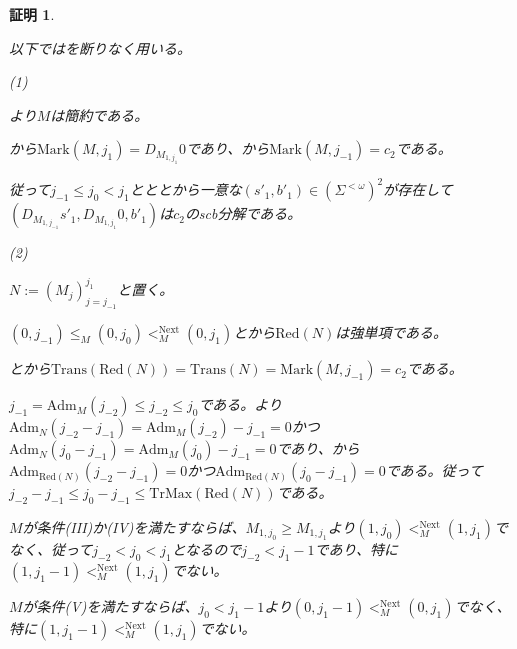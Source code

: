 \documentclass[dvipdfmx,uplatex]{jsarticle}
\theoremstyle{customnonumberbreakfortheorem}
\theoremstyle{customnonumberbreakforproof}
\newtheorem{hideableproof}{証明}
\begin{document}
\begin{hideableproof}
	\begin{indented}
		\item 以下ではを断りなく用いる。
		\item
		\item (1)
		\item {}より\(M\)は簡約である。
		\item {}から\(\textrm{Mark}(M,j_1) = D_{M_{1,j_1}} 0\)であり、から\(\textrm{Mark}(M,j_{-1}) = c_2\)である。
		\item 従って\(j_{-1} \leq j_0 < j_1\)とととから一意な\((s'_1,b'_1) \in (\Sigma^{< \omega})^2\)が存在して\((D_{M_{1,j_{-1}}} s'_1,D_{M_{1,j_1}} 0,b'_1)\)は\(c_2\)のscb分解である。
		\item
		\item (2)
		\item \(N := (M_j)_{j=j_{-1}}^{j_1}\)と置く。
		\item \((0,j_{-1}) \leq_M (0,j_0) <_M^{\textrm{Next}} (0,j_1)\)とから\(\textrm{Red}(N)\)は強単項である。
		\item {}とから\(\textrm{Trans}(\textrm{Red}(N)) = \textrm{Trans}(N) = \textrm{Mark}(M,j_{-1}) = c_2\)である。
		\item \(j_{-1} = \textrm{Adm}_M(j_{-2}) \leq j_{-2} \leq j_0\)である。より\(\textrm{Adm}_N(j_{-2}-j_{-1}) = \textrm{Adm}_M(j_{-2})-j_{-1} = 0\)かつ\(\textrm{Adm}_N(j_0-j_{-1}) = \textrm{Adm}_M(j_0)-j_{-1} = 0\)であり、から\(\textrm{Adm}_{\textrm{Red}(N)}(j_{-2}-j_{-1}) = 0\)かつ\(\textrm{Adm}_{\textrm{Red}(N)}(j_0-j_{-1}) = 0\)である。従って\(j_{-2}-j_{-1} \leq j_0-j_{-1} \leq \textrm{TrMax}(\textrm{Red}(N))\)である。
		\item \(M\)が条件(III)か(IV)を満たすならば、\(M_{1,j_0} \geq M_{1,j_1}\)より\((1,j_0) <_M^{\textrm{Next}} (1,j_1)\)でなく、従って\(j_{-2} < j_0 < j_1\)となるので\(j_{-2} < j_1-1\)であり、特に\((1,j_1-1) <_M^{\textrm{Next}} (1,j_1)\)でない。
		\item \(M\)が条件(V)を満たすならば、\(j_0 < j_1-1\)より\((0,j_1-1) <_M^{\textrm{Next}} (0,j_1)\)でなく、特に\((1,j_1-1) <_M^{\textrm{Next}} (1,j_1)\)でない。

\end{indented}
\end{hideableproof}
\end{document}
